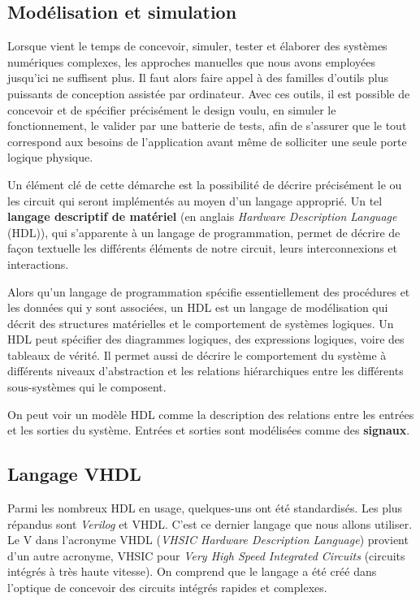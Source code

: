 \documentclass[11pt]{article}
\begin{document}
\subsection{Modélisation et simulation}
\label{sec:orga4a5fa4}

Lorsque vient le temps de concevoir, simuler, tester et élaborer des
systèmes numériques complexes, les approches manuelles que nous avons
employées jusqu'ici ne suffisent plus. Il faut alors faire appel à des
familles d'outils plus puissants de conception assistée par
ordinateur. Avec ces outils, il est possible de concevoir et de
spécifier précisément le design voulu, en simuler le fonctionnement,
le valider par une batterie de tests, afin de s'assurer que le tout
correspond aux besoins de l'application avant même de solliciter une
seule porte logique physique.

Un élément clé de cette démarche est la possibilité de décrire
précisément le ou les circuit qui seront implémentés au moyen d'un
langage approprié. Un tel \textbf{langage descriptif de matériel} (en anglais
\emph{Hardware Description Language} (HDL)), qui s'apparente à un langage
de programmation, permet de décrire de façon textuelle les différents
éléments de notre circuit, leurs interconnexions et interactions.

Alors qu'un langage de programmation spécifie essentiellement des
procédures et les données qui y sont associées, un HDL est un langage
de modélisation qui décrit des structures matérielles et le
comportement de systèmes logiques. Un HDL peut spécifier des
diagrammes logiques, des expressions logiques, voire des tableaux de
vérité. Il permet aussi de décrire le comportement du système à
différents niveaux d'abstraction et les relations hiérarchiques entre
les différents sous-systèmes qui le composent.

On peut voir un modèle HDL comme la description des relations entre
les entrées et les sorties du système. Entrées et sorties sont
modélisées comme des \textbf{signaux}.

\subsection{Langage VHDL}
\label{sec:org6c24f61}

Parmi les nombreux HDL en usage, quelques-uns ont été
standardisés. Les plus répandus sont \emph{Verilog} et VHDL. C'est ce
dernier langage que nous allons utiliser.  Le V dans l'acronyme VHDL
(\emph{VHSIC Hardware Description Language}) provient d'un autre acronyme,
VHSIC pour \emph{Very High Speed Integrated Circuits} (circuits intégrés à
très haute vitesse). On comprend que le langage a été créé dans
l'optique de concevoir des circuits intégrés rapides et complexes.
\end{document}
